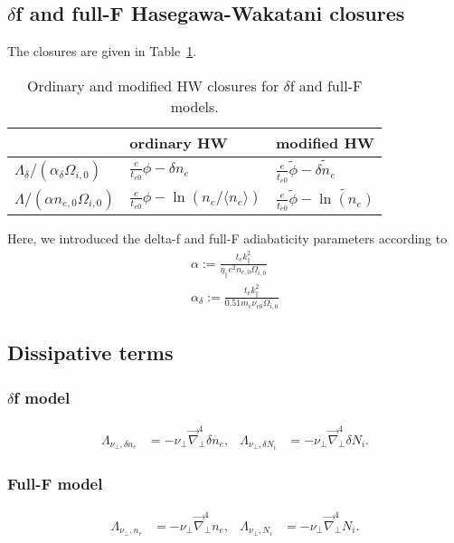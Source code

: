 \subsection{\(\delta\)f and full-F Hasegawa-Wakatani closures}
The closures are given in Table~\ref{table:hwmhwtable}.
\begin{table}[!htp]
\centering
 \caption{Ordinary and modified HW closures for \(\delta\)f and full-F models.}
 \label{table:hwmhwtable}
\begin{tabular}{ l  l  l }
   & ordinary HW &  modified HW \\
     \hline			
  \(\Lambda_\delta/(\alpha_\delta \Omega_{i,0})\) & \( \frac{e}{t_{e0}}\phi-\delta n_e \) & \(  \frac{e}{t_{e0}}\widetilde{\phi}- \widetilde{ \delta n_e}\)\\
 \({\Lambda}/(\alpha n_{e,0} \Omega_{i,0})\) & \( \frac{e}{t_{e0}}\phi -\ln\left(n_e/\langle{  n_e }\rangle\right)  \)          & \( \frac{e}{t_{e0}} \widetilde{\phi}-\widetilde{\ln\left(n_e\right)}\)  \\
\end{tabular}
\end{table}
Here, we introduced the delta-f and full-F adiabaticity parameters according to
\begin{align}
\alpha:= \frac{ t_{e}  k_\parallel^2 }{ \eta_\parallel e^2   n_{e,0} \Omega_{i,0} } \\
 \alpha_\delta := \frac{t_e k_\parallel^2 }{0.51 m_e \nu_{e0} \Omega_{i,0}} 
\end{align}
\subsection{Dissipative terms}
\subsubsection{\(\delta\)f model}
\begin{align}\label{eq:perpdiffn}
 \Lambda_{\nu_\perp,\delta n_e} &=  -\nu_\perp \vec{\nabla}_\perp^4 \delta n_e, &
 \Lambda_{\nu_\perp,\delta N_i} &=  -\nu_\perp \vec{\nabla}_\perp^4 \delta  N_i.
\end{align}
\subsubsection{Full-F model}
\begin{align}\label{eq:perpdiffn}
 \Lambda_{\nu_\perp,n_e} &=  -\nu_\perp \vec{\nabla}_\perp^4 n_e, &
 \Lambda_{\nu_\perp,N_i} &=  -\nu_\perp \vec{\nabla}_\perp^4 N_i.
\end{align}
